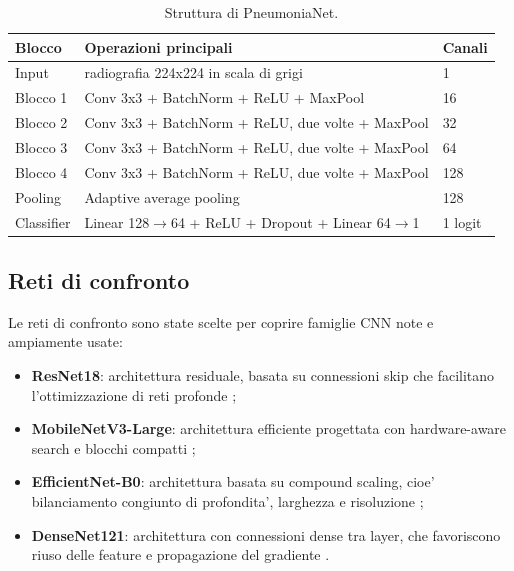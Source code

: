 \documentclass[11pt,a4paper]{article}
\begin{document}
\begin{table}[H]
\centering
\caption{Struttura di PneumoniaNet.}
\begin{tabular}{lll}
\toprule
Blocco & Operazioni principali & Canali \\
\midrule
Input & radiografia 224x224 in scala di grigi & 1 \\
Blocco 1 & Conv 3x3 + BatchNorm + ReLU + MaxPool & 16 \\
Blocco 2 & Conv 3x3 + BatchNorm + ReLU, due volte + MaxPool & 32 \\
Blocco 3 & Conv 3x3 + BatchNorm + ReLU, due volte + MaxPool & 64 \\
Blocco 4 & Conv 3x3 + BatchNorm + ReLU, due volte + MaxPool & 128 \\
Pooling & Adaptive average pooling & 128 \\
Classifier & Linear 128$\rightarrow$64 + ReLU + Dropout + Linear 64$\rightarrow$1 & 1 logit \\
\bottomrule
\end{tabular}
\end{table}

\subsection{Reti di confronto}

Le reti di confronto sono state scelte per coprire famiglie CNN note e
ampiamente usate:

\begin{itemize}
  \item \textbf{ResNet18}: architettura residuale, basata su connessioni skip
  che facilitano l'ottimizzazione di reti profonde \cite{he2016resnet};
  \item \textbf{MobileNetV3-Large}: architettura efficiente progettata con
  hardware-aware search e blocchi compatti \cite{howard2019mobilenetv3};
  \item \textbf{EfficientNet-B0}: architettura basata su compound scaling, cioe'
  bilanciamento congiunto di profondita', larghezza e risoluzione
  \cite{tan2019efficientnet};
  \item \textbf{DenseNet121}: architettura con connessioni dense tra layer, che
  favoriscono riuso delle feature e propagazione del gradiente
  \cite{huang2017densenet}.
\end{itemize}
\end{document}
